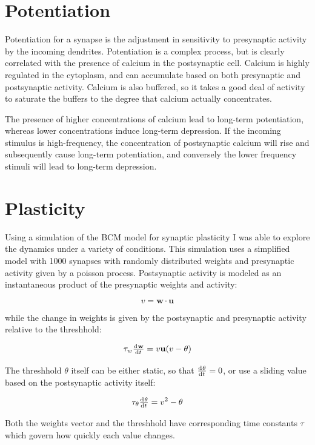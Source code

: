 \documentclass[12pt]{article}
\begin{document}
\maketitle

\section{Potentiation}

Potentiation for a synapse is the adjustment in sensitivity to presynaptic activity by the incoming dendrites.  Potentiation is a complex process, but is clearly correlated with the presence of calcium in the postsynaptic cell.  Calcium is highly regulated in the cytoplasm, and can accumulate based on both presynaptic and postsynaptic activity.  Calcium is also buffered, so it takes a good deal of activity to saturate the buffers to the degree that calcium actually concentrates.  

The presence of higher concentrations of calcium lead to long-term potentiation, whereas lower concentrations induce long-term depression.  If the incoming stimulus is high-frequency, the concentration of postsynaptic calcium will rise and subsequently cause long-term potentiation, and conversely the lower frequency stimuli will lead to long-term depression.

\section{Plasticity}

Using a simulation of the BCM model for synaptic plasticity I was able to explore the dynamics under a variety of conditions.  This simulation uses a simplified model with 1000 synapses with randomly distributed weights and presynaptic activity given by a poisson process.  Postsynaptic activity is modeled as an instantaneous product of the presynaptic weights and activity:

$$ v=\mathbf{w}\cdot\mathbf{u} $$

while the change in weights is given by the postsynaptic and presynaptic activity relative to the threshhold:

$$ \tau_w\od{\mathbf{w}}{t}=v\mathbf{u}(v-\theta) $$

The threshhold $\theta$ itself can be either static, so that $\od{\theta}{t}=0$, or use a sliding value based on the postsynaptic activity itself:

$$ \tau_\theta\od{\theta}{t}=v^2-\theta $$

Both the weights vector and the threshhold have corresponding time constants $\tau$ which govern how quickly each value changes.  
\end{document}

